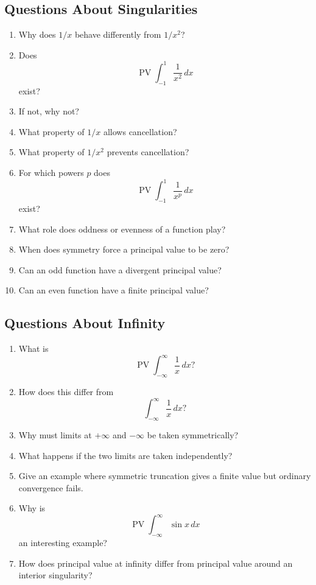 \subsection{Questions About Singularities}

\begin{enumerate}[resume]
  \item Why does \(1/x\) behave differently from \(1/x^{2}\)?
  \item Does
    \[ \operatorname{PV}\int_{-1}^{1}\frac{1}{x^{2}}\,dx \]
    exist?
  \item If not, why not?
  \item What property of \(1/x\) allows cancellation?
  \item What property of \(1/x^{2}\) prevents cancellation?
  \item For which powers \(p\) does
    \[ \operatorname{PV}\int_{-1}^{1}\frac{1}{x^{p}}\,dx \]
    exist?
  \item What role does oddness or evenness of a function play?
  \item When does symmetry force a principal value to be zero?
  \item Can an odd function have a divergent principal value?
  \item Can an even function have a finite principal value?
\end{enumerate}

\subsection{Questions About Infinity}

\begin{enumerate}[resume]
  \item What is
    \[ \operatorname{PV}\int_{-\infty}^{\infty}\frac{1}{x}\,dx? \]
  \item How does this differ from
    \[ \int_{-\infty}^{\infty}\frac{1}{x}\,dx? \]
  \item Why must limits at \(+\infty\) and \(-\infty\) be taken symmetrically?
  \item What happens if the two limits are taken independently?
  \item Give an example where symmetric truncation gives a finite value but ordinary convergence fails.
  \item Why is
    \[ \operatorname{PV}\int_{-\infty}^{\infty}\sin x\,dx \]
    an interesting example?
  \item How does principal value at infinity differ from principal value around an interior singularity?
\end{enumerate}

